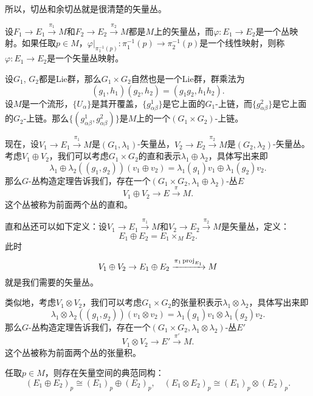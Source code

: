 所以，切丛和余切丛就是很清楚的矢量丛。

\begin{para}[矢量丛映射]
设$F_1\to E_1\xrightarrow{\pi_1} M$和$F_2\to E_2\xrightarrow{\pi_2} M$都是$M$上的矢量丛，而$\varphi:E_1\to E_2$是一个丛映射。如果任取$p\in M$，$\varphi|_{\pi_1^{-1}(p)}:\pi_1^{-1}(p)\to \pi_2^{-1}(p)$是一个线性映射，则称$\varphi:E_1\to E_2$是一个矢量丛映射。
\end{para}

\begin{para}[矢量丛的直和与张量积]
设$G_1$, $G_2$都是Lie群，那么$G_1\times G_2$自然也是一个Lie群，群乘法为
\[
	(g_1,h_1)(g_2,h_2)=(g_1g_2,h_1h_2).
\]
设$M$是一个流形，$\{U_\alpha\}$是其开覆盖，$\{g^1_{\alpha\beta}\}$是它上面的$G_1$-上链，而$\{g^2_{\alpha\beta}\}$是它上面的$G_2$-上链。那么$\{(g^1_{\alpha\beta},g^2_{\alpha\beta})\}$是$M$上的一个$(G_1\times G_2)$-上链。

现在，设$V_1\to E_1\xrightarrow{\pi_1}M$是$(G_1,\lambda_1)$-矢量丛，$V_2\to E_2\xrightarrow{\pi_2}M$是$(G_2,\lambda_2)$-矢量丛。考虑$V_1\oplus V_2$，我们可以考虑$G_1\times G_2$的直和表示$\lambda_1\oplus \lambda_2$，具体写出来即
\[
	\lambda_1\oplus \lambda_2((g_1,g_2))(v_1\oplus v_2)=\lambda_1(g_1)v_1\oplus \lambda_1(g_2)v_2.
\]
那么$G$-丛构造定理告诉我们，存在一个$(G_1\times G_2,\lambda_1\oplus \lambda_2)$-丛$E$
\[
	V_1\oplus V_2\to E\xrightarrow{\pi} M.
\]
这个丛被称为前面两个丛的直和。

直和丛还可以如下定义：设$V_1\to E_1\xrightarrow{\pi_1}M$和$V_2\to E_2\xrightarrow{\pi_2}M$是矢量丛，定义：
\[
	E_1\oplus E_2 = E_1\times_M E_2.
\]
此时
\[
	V_1\oplus V_2\to E_1\oplus E_2\xrightarrow{\pi_1\operatorname{proj}_{E_1}} M
\]
就是我们需要的矢量丛。


类似地，考虑$V_1\otimes V_2$，我们可以考虑$G_1\times G_2$的张量积表示$\lambda_1\otimes \lambda_2$，具体写出来即
\[
	\lambda_1\otimes \lambda_2((g_1,g_2))(v_1\otimes v_2)=\lambda_1(g_1)v_1\otimes \lambda_1(g_2)v_2.
\]
那么$G$-丛构造定理告诉我们，存在一个$(G_1\times G_2,\lambda_1\otimes \lambda_2)$-丛$E'$
\[
	V_1\otimes V_2\to E'\xrightarrow{\pi'} M.
\]
这个丛被称为前面两个丛的张量积。
\end{para}

\begin{pro}
任取$p\in M$，则存在矢量空间的典范同构：
\[
	(E_1\oplus E_2)_p\cong (E_1)_p\oplus (E_2)_p,\quad (E_1\otimes E_2)_p\cong (E_1)_p\otimes (E_2)_p.
\]
\end{pro}

